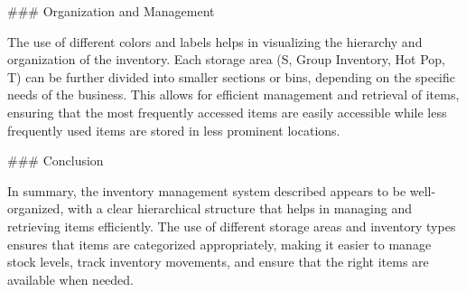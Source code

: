 ### Organization and Management

The use of different colors and labels helps in visualizing the hierarchy and organization of the inventory. Each storage area (S, Group Inventory, Hot Pop, T) can be further divided into smaller sections or bins, depending on the specific needs of the business. This allows for efficient management and retrieval of items, ensuring that the most frequently accessed items are easily accessible while less frequently used items are stored in less prominent locations.

### Conclusion

In summary, the inventory management system described appears to be well-organized, with a clear hierarchical structure that helps in managing and retrieving items efficiently. The use of different storage areas and inventory types ensures that items are categorized appropriately, making it easier to manage stock levels, track inventory movements, and ensure that the right items are available when needed.